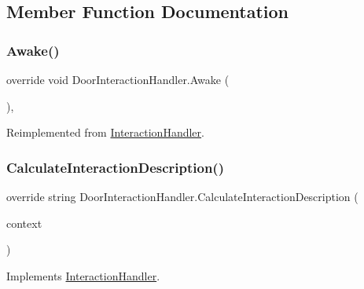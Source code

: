 \subsection{Member Function Documentation}
\mbox{\label{class_door_interaction_handler_ae1d36b6037ec736fed8b528e5125f1be}} 
\subsubsection{\texorpdfstring{Awake()}{Awake()}}
{\footnotesize\ttfamily override void Door\+Interaction\+Handler.\+Awake (\begin{DoxyParamCaption}{ }\end{DoxyParamCaption})\hspace{0.3cm}{\ttfamily [protected]}, {\ttfamily [virtual]}}



Reimplemented from \mbox{\hyperlink{class_interaction_handler_adbbb312d562d3060de296f6da5c97631}{Interaction\+Handler}}.

\mbox{\label{class_door_interaction_handler_a946244bed82fef5c376529a64fcc9f06}} 
\subsubsection{\texorpdfstring{Calculate\+Interaction\+Description()}{CalculateInteractionDescription()}}
{\footnotesize\ttfamily override string Door\+Interaction\+Handler.\+Calculate\+Interaction\+Description (\begin{DoxyParamCaption}\item[{\mbox{\hyperlink{class_interaction_context}{Interaction\+Context}}}]{context }\end{DoxyParamCaption})\hspace{0.3cm}{\ttfamily [virtual]}}



Implements \mbox{\hyperlink{class_interaction_handler_acdd154cb8b276e122915412b3b7274d3}{Interaction\+Handler}}.

